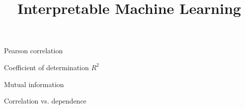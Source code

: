 \documentclass[10pt,compress,t,notes=noshow, xcolor=table]{beamer}
\title{Interpretable Machine Learning}
\begin{document}
{
\item Pearson correlation
\item Coefficient of determination $R^2$
\item Mutual information
\item Correlation vs. dependence
}

%
%
%
%
\end{document}
